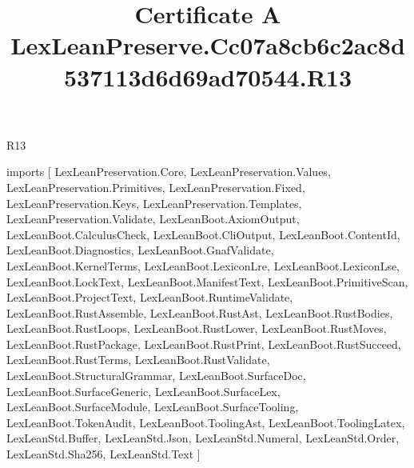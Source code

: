 \begin{lexlean}{R13}
\title{Certificate A LexLeanPreserve.Cc07a8cb6c2ac8d537113d6d69ad70544.R13}
\begin{coremodule}
imports [
  LexLeanPreservation.Core,
  LexLeanPreservation.Values,
  LexLeanPreservation.Primitives,
  LexLeanPreservation.Fixed,
  LexLeanPreservation.Keys,
  LexLeanPreservation.Templates,
  LexLeanPreservation.Validate,
  LexLeanBoot.AxiomOutput,
  LexLeanBoot.CalculusCheck,
  LexLeanBoot.CliOutput,
  LexLeanBoot.ContentId,
  LexLeanBoot.Diagnostics,
  LexLeanBoot.GnafValidate,
  LexLeanBoot.KernelTerms,
  LexLeanBoot.LexiconLre,
  LexLeanBoot.LexiconLse,
  LexLeanBoot.LockText,
  LexLeanBoot.ManifestText,
  LexLeanBoot.PrimitiveScan,
  LexLeanBoot.ProjectText,
  LexLeanBoot.RuntimeValidate,
  LexLeanBoot.RustAssemble,
  LexLeanBoot.RustAst,
  LexLeanBoot.RustBodies,
  LexLeanBoot.RustLoops,
  LexLeanBoot.RustLower,
  LexLeanBoot.RustMoves,
  LexLeanBoot.RustPackage,
  LexLeanBoot.RustPrint,
  LexLeanBoot.RustSucceed,
  LexLeanBoot.RustTerms,
  LexLeanBoot.RustValidate,
  LexLeanBoot.StructuralGrammar,
  LexLeanBoot.SurfaceDoc,
  LexLeanBoot.SurfaceGeneric,
  LexLeanBoot.SurfaceLex,
  LexLeanBoot.SurfaceModule,
  LexLeanBoot.SurfaceTooling,
  LexLeanBoot.TokenAudit,
  LexLeanBoot.ToolingAst,
  LexLeanBoot.ToolingLatex,
  LexLeanStd.Buffer,
  LexLeanStd.Json,
  LexLeanStd.Numeral,
  LexLeanStd.Order,
  LexLeanStd.Sha256,
  LexLeanStd.Text
]


\end{coremodule}
\end{lexlean}
